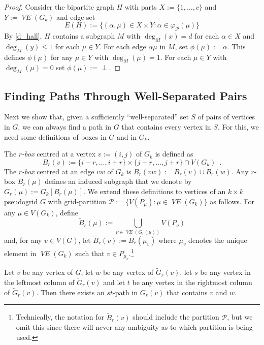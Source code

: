 \documentclass{patmorin}
\newcommand{\defin}[1]{\emph{\color{brown}#1}}
\DeclareMathOperator{\VE}{\mathit{VE}}
\begin{document}
\begin{proof}
  Consider the bipartite graph $H$ with parts $X:=\{1,\ldots,c\}$ and $Y:=\VE(G_k)$ and edge set
  \[
    E(H) := \{ (\alpha,\mu)\in X\times Y: \alpha\in\varphi_\mathcal{P}(\mu) \}
  \]
  By \cref{d_hall}, $H$ contains a subgraph $M$ with $\deg_M(x)=d$ for each $\alpha\in X$ and $\deg_M(y)\le 1$ for each $\mu\in Y$.  For each edge $\alpha\mu$ in $M$, set $\phi(\mu):=\alpha$.  This defines $\phi(\mu)$ for any $\mu\in Y$ with $\deg_M(\mu)=1$.  For each $\mu\in Y$ with $\deg_M(\mu)=0$ set $\phi(\mu):=\perp$.
\end{proof}

\subsection{Finding Paths Through Well-Separated Pairs}

Next we show that, given a sufficiently ``well-separated'' set $S$ of pairs of vertices in $G$, we can always find a path in $G$ that contains every vertex in $S$. For this, we need some definitions of boxes in $G$ and in $G_k$.

The \defin{$r$-box} centred at a vertex $v:=(i,j)$ of $G_{k}$ is defined as
\[
  B_r(v) := \{i-r,\ldots,i+r\}\times\{j-r,\ldots,j+r\} \cap V(G_{k}) \enspace .
\]
The \defin{$r$-box} centred at an edge $vw$ of $G_{k}$ is $B_r(vw):=B_r(v)\cup B_r(w)$.  
Any $r$-box $B_r(\mu)$ defines an induced subgraph that we denote by $G_r(\mu):=G_{k}[B_r(\mu)]$.  We extend these definitions to vertices of an $k\times k$ pseudogrid $G$ with grid-partition $\mathcal{P}:=\{V(P_\mu):\mu\in\VE(G_k)\}$ as follows. For any $\mu\in V(G_k)$, define
\[
   \tilde{B}_r(\mu) := \bigcup_{\nu\in \VE(G_r(\mu))} V(P_\nu)
\]
and, for any $v\in V(G)$, let $\tilde{B}_r(v):=\tilde{B}_r(\mu_v)$
where $\mu_v$ denotes the unique element in $\VE(G_k)$ such that $v\in P_{\mu_v}$.\footnote{Technically, the notation for $\tilde{B}_r(v)$ should include the partition $\mathcal{P}$, but we omit this since there will never any ambiguity as to which partition is being used.}

\begin{lem}\label{pick_up_two}
  Let $v$ be any vertex of $G$, let $w$ be any vertex of $\tilde{G}_r(v)$, let $s$ be any vertex in the leftmost column of $\tilde{G}_r(v)$ and let $t$ be any vertex in the rightmost column of $\tilde{G}_r(v)$.  Then there exists an $st$-path in $G_r(v)$ that contains $v$ and $w$.
\end{lem}
\end{document}
